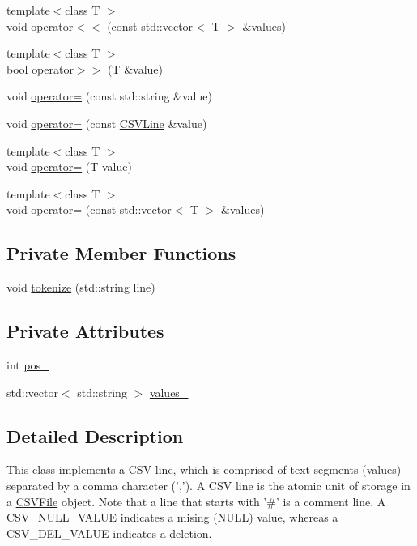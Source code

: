 \begin{DoxyCompactItemize}
\item 
{\footnotesize template$<$class T $>$ }\\void \hyperlink{classCSVLine_a748487c66e0b0276d931669a39f77e8d}{operator$<$$<$} (const std\+::vector$<$ T $>$ \&\hyperlink{classCSVLine_ab7f413beb00cf9d629a56e655a469f13}{values})
\item 
{\footnotesize template$<$class T $>$ }\\bool \hyperlink{classCSVLine_acba2fa9b774450f592e8b6209a41c2ff}{operator$>$$>$} (T \&value)
\item 
void \hyperlink{classCSVLine_ad2786d4428cd255e1c68836f58e4b6c0}{operator=} (const std\+::string \&value)
\item 
void \hyperlink{classCSVLine_a02cf47d33c1fb69d336f004b7168f958}{operator=} (const \hyperlink{classCSVLine}{C\+S\+V\+Line} \&value)
\item 
{\footnotesize template$<$class T $>$ }\\void \hyperlink{classCSVLine_ac09c6eaa3ecc4268c70a4499635c1f57}{operator=} (T value)
\item 
{\footnotesize template$<$class T $>$ }\\void \hyperlink{classCSVLine_a4aab81737cd4a47d8230a1e2c261a869}{operator=} (const std\+::vector$<$ T $>$ \&\hyperlink{classCSVLine_ab7f413beb00cf9d629a56e655a469f13}{values})
\end{DoxyCompactItemize}
\subsection*{Private Member Functions}
\begin{DoxyCompactItemize}
\item 
void \hyperlink{classCSVLine_ae5d1bc71a20bbbe86ea0a1875e714a49}{tokenize} (std\+::string line)
\end{DoxyCompactItemize}
\subsection*{Private Attributes}
\begin{DoxyCompactItemize}
\item 
int \hyperlink{classCSVLine_ae589ad22949aef6a7533f7923f23d64d}{pos\+\_\+}
\item 
std\+::vector$<$ std\+::string $>$ \hyperlink{classCSVLine_a867dc78e96099853637cf5dbf828a1a7}{values\+\_\+}
\end{DoxyCompactItemize}


\subsection{Detailed Description}
This class implements a C\+S\+V line, which is comprised of text segments (values) separated by a comma character (','). A C\+S\+V line is the atomic unit of storage in a \hyperlink{classCSVFile}{C\+S\+V\+File} object. Note that a line that starts with '\#' is a comment line. A C\+S\+V\+\_\+\+N\+U\+L\+L\+\_\+\+V\+A\+L\+U\+E indicates a mising (N\+U\+L\+L) value, whereas a C\+S\+V\+\_\+\+D\+E\+L\+\_\+\+V\+A\+L\+U\+E indicates a deletion. 


